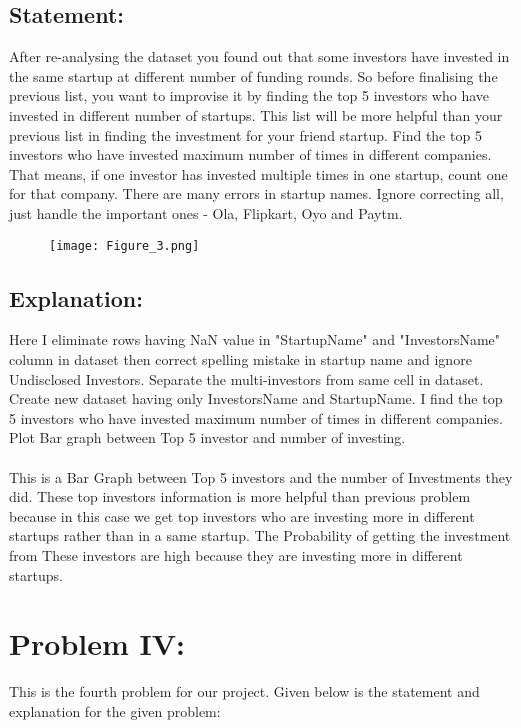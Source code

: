 \documentclass[12pt,a4paper]{article}
\begin{document}
\subsection{Statement:}
After re-analysing the dataset you found out that some investors have invested in the same startup at different number of funding rounds. So before finalising the previous list, you want to improvise it by finding the top 5 investors who have invested in different number of startups. This list will be more helpful than your previous list in finding the investment for your friend startup. Find the top 5 investors who have invested maximum number of times in different companies. That means, if one investor has invested multiple times in one startup, count one for that company. There are many errors in startup names. Ignore correcting all, just handle the important ones - Ola, Flipkart, Oyo and Paytm.
\begin{figure}[!ht]
	\begin{center}
			\texttt{[image: Figure\_3.png]}
	\end{center}
\end{figure}
\subsection{Explanation:}
Here I eliminate rows having NaN value in "StartupName" and "InvestorsName" column in dataset then correct spelling mistake in startup name and ignore Undisclosed Investors. Separate the multi-investors from same cell in
dataset. Create new dataset having only InvestorsName and StartupName. I find the top 5 investors who have invested maximum number of times in different companies. Plot Bar graph between Top 5 investor and number of investing.\\
\\This is a Bar Graph between Top 5 investors and the number of Investments they did. These top investors information is more helpful than previous problem because in this case we get top investors who are investing more in different startups rather than in a same startup. The Probability of getting the investment from These investors are high because they are investing more in different startups.
\section{Problem IV:}
This is the fourth problem for our project. Given below is the statement and explanation for the given problem:
\end{document}
